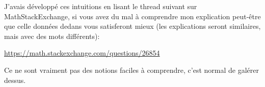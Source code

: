 \documentclass[a4paper]{article}
\begin{document}
{{        J'avais développé ces intuitions en lisant le thread suivant sur MathStackExchange, si vous avez du mal à comprendre mon explication peut-être que celle données dedans vous satisferont mieux (les explications seront similaires, mais avec des mots différents): 
        \begin{center}
            \url{https://math.stackexchange.com/questions/26854}
        \end{center}
        
        Ce ne sont vraiment pas des notions faciles à comprendre, c'est normal de galérer dessus.
    }
    


}
\end{document}
